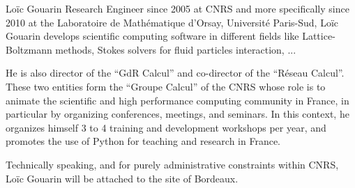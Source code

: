 \begin{participant}[type=R,PM=5,gender=male]{Lo\"ic Gouarin}
  Research Engineer since 2005 at CNRS and more specifically since
  2010 at the Laboratoire de Mathématique d'Orsay, Université
  Paris-Sud, Loïc Gouarin develops scientific computing software in
  different fields like Lattice-Boltzmann methods, Stokes solvers for
  fluid particles interaction, ...

  He is also director of the ``GdR Calcul'' and co-director of the
  ``Réseau Calcul''. These two entities form the ``Groupe Calcul'' of
  the CNRS whose role is to animate the scientific and high
  performance computing community in France, in particular by
  organizing conferences, meetings, and seminars. In this context, he
  organizes himself 3 to 4 training and development workshops per
  year, and promotes the use of Python for teaching and research in
  France.

  Technically speaking, and for purely administrative constraints
  within CNRS, Loïc Gouarin will be attached to the site of Bordeaux.
\end{participant}

